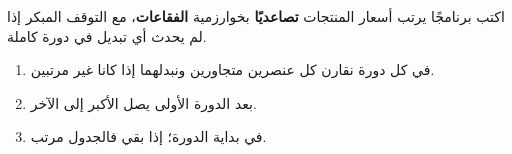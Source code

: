 \begin{statement}
اكتب برنامجًا يرتب أسعار المنتجات \textbf{تصاعديًا} بخوارزمية \textbf{الفقاعات}، مع التوقف المبكر إذا لم يحدث أي تبديل في دورة كاملة.
\end{statement}
\begin{stepsbox}\begin{enumerate}
\item في كل دورة نقارن كل عنصرين متجاورين ونبدلهما إذا كانا غير مرتبين.
\item بعد الدورة الأولى يصل الأكبر إلى الآخر.
\item {} في بداية الدورة؛ إذا بقي  فالجدول مرتب.
\end{enumerate}\end{stepsbox}

